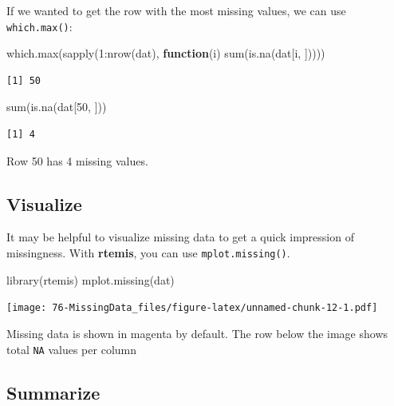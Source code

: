 \documentclass[
]{book}
\newenvironment{Shaded}{\begin{snugshade}}{\end{snugshade}}
\newcommand{\ControlFlowTok}[1]{\textcolor[rgb]{0.13,0.29,0.53}{\textbf{#1}}}
\newcommand{\DecValTok}[1]{\textcolor[rgb]{0.00,0.00,0.81}{#1}}
\newcommand{\FunctionTok}[1]{\textcolor[rgb]{0.00,0.00,0.00}{#1}}
\newcommand{\NormalTok}[1]{#1}
\newcommand{\SpecialCharTok}[1]{\textcolor[rgb]{0.00,0.00,0.00}{#1}}
\begin{document}
If we wanted to get the row with the most missing values, we can use \texttt{which.max()}:

\begin{Shaded}
\begin{Highlighting}[]
\FunctionTok{which.max}\NormalTok{(}\FunctionTok{sapply}\NormalTok{(}\DecValTok{1}\SpecialCharTok{:}\FunctionTok{nrow}\NormalTok{(dat), }\ControlFlowTok{function}\NormalTok{(i) }\FunctionTok{sum}\NormalTok{(}\FunctionTok{is.na}\NormalTok{(dat[i, ]))))}
\end{Highlighting}
\end{Shaded}

\begin{verbatim}
[1] 50
\end{verbatim}

\begin{Shaded}
\begin{Highlighting}[]
\FunctionTok{sum}\NormalTok{(}\FunctionTok{is.na}\NormalTok{(dat[}\DecValTok{50}\NormalTok{, ]))}
\end{Highlighting}
\end{Shaded}

\begin{verbatim}
[1] 4
\end{verbatim}

Row 50 has 4 missing values.

\hypertarget{visualize}{%
\subsection{Visualize}\label{visualize}}

It may be helpful to visualize missing data to get a quick impression of missingness. With \textbf{rtemis}, you can use \texttt{mplot.missing()}.

\begin{Shaded}
\begin{Highlighting}[]
\FunctionTok{library}\NormalTok{(rtemis)}
\FunctionTok{mplot.missing}\NormalTok{(dat)}
\end{Highlighting}
\end{Shaded}

\texttt{[image: 76-MissingData\_files/figure-latex/unnamed-chunk-12-1.pdf]}

Missing data is shown in magenta by default. The row below the image shows total \texttt{NA} values per column

\hypertarget{summarize-1}{%
\subsection{Summarize}\label{summarize-1}}
\end{document}
